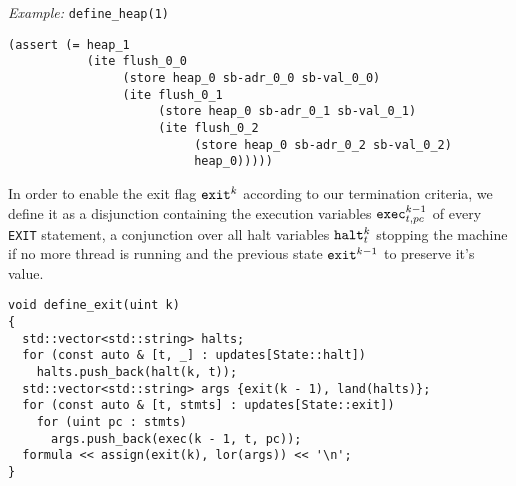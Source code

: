 \noindent
\emph{Example:} \lstinline[style=c++]{define_heap(1)}

\begin{lstlisting}[language=SMTLib]
(assert (= heap_1
           (ite flush_0_0
                (store heap_0 sb-adr_0_0 sb-val_0_0)
                (ite flush_0_1
                     (store heap_0 sb-adr_0_1 sb-val_0_1)
                     (ite flush_0_2
                          (store heap_0 sb-adr_0_2 sb-val_0_2)
                          heap_0)))))
\end{lstlisting}


%
%
%
%

\noindent
In order to enable the exit flag $\texttt{exit}^k$ according to our termination criteria, we define it as a disjunction containing the execution variables $\texttt{exec}^{k - 1}_{t, pc}$ of every \lstinline[language={[concubine]Assembler}]{EXIT} statement, a conjunction over all halt variables $\texttt{halt}^k_t$ stopping the machine if no more thread is running and the previous state $\texttt{exit}^{k - 1}$ to preserve it's value.

\begin{lstlisting}[style=c++]
void define_exit(uint k)
{
  std::vector<std::string> halts;
  for (const auto & [t, _] : updates[State::halt])
    halts.push_back(halt(k, t));
  std::vector<std::string> args {exit(k - 1), land(halts)};
  for (const auto & [t, stmts] : updates[State::exit])
    for (uint pc : stmts)
      args.push_back(exec(k - 1, t, pc));
  formula << assign(exit(k), lor(args)) << '\n';
}
\end{lstlisting}

